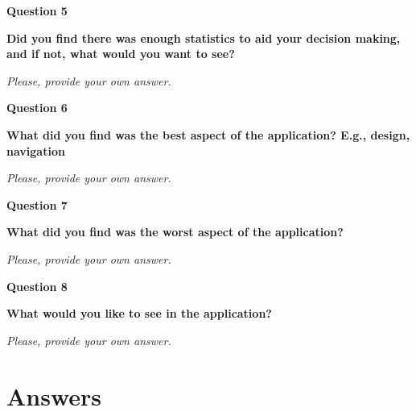  \textbf{Question 5}\par
\textbf{Did you find there was enough statistics to aid your decision making, and if not, what would you want to see?}\par
\emph{Please, provide your own answer.}
 
 \textbf{Question 6}\par
\textbf{What did you find was the best aspect of the application? E.g., design, navigation}\par
\emph{Please, provide your own answer.}

\textbf{Question 7}\par
\textbf{What did you find was the worst aspect of the application?}\par
\emph{Please, provide your own answer.}

\textbf{Question 8}\par
\textbf{What would you like to see in the application?}\par
\emph{Please, provide your own answer.}

\section{Answers}
\label{sec:ua_answers_appendix}

